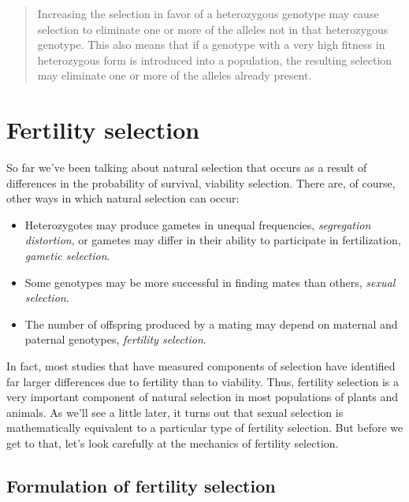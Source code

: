 \documentclass[12pt]{article}
\begin{document}
\begin{quote}
Increasing the selection in favor of a heterozygous genotype may cause
selection to eliminate one or more of the alleles not in that
heterozygous genotype. This also means that if a genotype with a very
high fitness in heterozygous form is introduced into a population, the
resulting selection may eliminate one or more of the alleles already
present.
\end{quote}

\section*{Fertility selection}

So far we've been talking about natural selection that occurs as a
result of differences in the probability of survival, viability
selection. There are, of course, other ways in which natural selection
can occur:

\begin{itemize}

\item Heterozygotes may produce gametes in unequal frequencies, {\it
  segregation distortion}, or gametes may differ in their ability to
  participate in fertilization, {\it gametic selection}.

\item Some genotypes may be more successful in finding mates than
  others, {\it sexual selection}.

\item The number of offspring produced by a mating may depend on
  maternal and paternal genotypes, {\it fertility selection}.

\end{itemize}

\noindent In fact, most studies that have measured components of
selection have identified far larger differences due to fertility than
to viability. Thus, fertility selection is a very important component
of natural selection in most populations of plants and animals. As
we'll see a little later, it turns out that sexual selection is
mathematically equivalent to a particular type of fertility
selection. But before we get to that, let's look carefully at the
mechanics of fertility selection.

\subsection*{Formulation of fertility selection}
\end{document}
